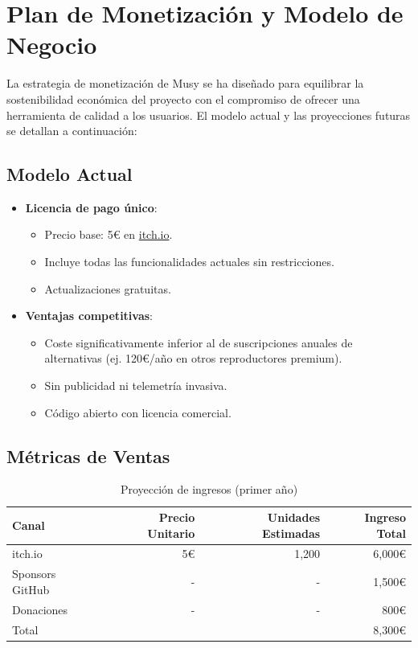 \documentclass[11pt, a4paper]{article}
\begin{document}
\section{Plan de Monetización y Modelo de Negocio}

La estrategia de monetización de Musy se ha diseñado para equilibrar la sostenibilidad económica del proyecto con el compromiso de ofrecer una herramienta de calidad a los usuarios. El modelo actual y las proyecciones futuras se detallan a continuación:

  \subsection{Modelo Actual}

  \begin{itemize}
    \item \textbf{Licencia de pago único}:
      \begin{itemize}
        \item Precio base: 5€ en \href{https://zmiko.itch.io/musy}{itch.io}.
        \item Incluye todas las funcionalidades actuales sin restricciones.
        \item Actualizaciones gratuitas.
      \end{itemize}

    \item \textbf{Ventajas competitivas}:
      \begin{itemize}
        \item Coste significativamente inferior al de suscripciones anuales de alternativas (ej. 120€/año en otros reproductores premium).
        \item Sin publicidad ni telemetría invasiva.
        \item Código abierto con licencia comercial.
      \end{itemize}
  \end{itemize}

  \subsection{Métricas de Ventas}

  \begin{table}[h]
    \centering
    \caption{Proyección de ingresos (primer año)}
    \begin{tabular}{lrrr}
      \hline
      Canal & Precio Unitario & Unidades Estimadas & Ingreso Total \\
      \hline
      itch.io & 5€ & 1,200 & 6,000€ \\
      Sponsors GitHub & - & - & 1,500€ \\
      Donaciones & - & - & 800€ \\
      \hline
      Total & & & 8,300€ \\
      \hline
    \end{tabular}
    \label{tab:ingresos}
  \end{table}
\end{document}
